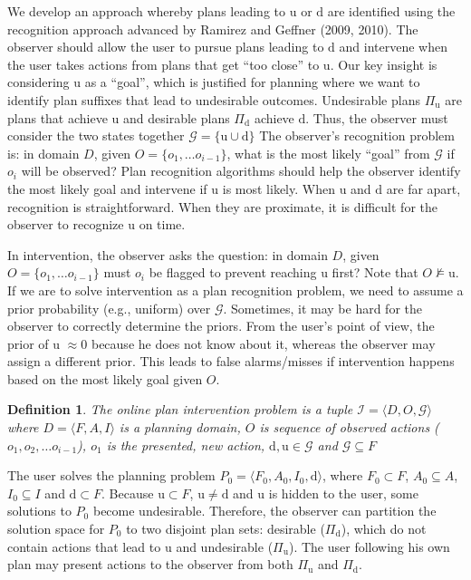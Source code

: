 \documentclass[letterpaper]{article}
\theoremstyle{plain}
\newtheorem{definition}{Definition}
\begin{document}
We develop an approach whereby plans leading to $\mathrm{u}$ or $\mathrm{d}$ are identified using the recognition approach advanced by Ramirez and Geffner (2009, 2010).
The observer should allow the user to pursue plans leading to $\mathrm{d}$ and intervene when the user takes actions from plans that get ``too close'' to $\mathrm{u}$.
Our key insight is considering $\mathrm{u}$ as a ``goal'', which is justified for planning where we want to identify plan suffixes that lead to undesirable outcomes. 
Undesirable plans $\Pi_{\mathrm{u}}$ are plans that achieve $\mathrm{u}$ and desirable plans $\Pi_{\mathrm{d}}$ achieve $\mathrm{d}$. 
Thus, the observer must consider the two states together $\mathcal{G}=\lbrace\mathrm{u} \cup \mathrm{d}\rbrace$
The observer's recognition problem is: in domain $D$, given $O = \lbrace o_1, \ldots o_{i-1}\rbrace$, what is the most likely ``goal'' from $\mathcal{G}$ if $o_i$ will be observed? 
Plan recognition algorithms should help the observer identify the most likely goal and intervene if $\mathrm{u}$ is most likely.
When $\mathrm{u}$ and $\mathrm{d}$ are far apart, recognition is straightforward.
When they are proximate, it is difficult for the observer to recognize $\mathrm{u}$ on time.

In intervention, the observer asks the question: in domain $D$, given $O = \lbrace o_1, \ldots o_{i-1}\rbrace$ must $o_i$ be flagged to prevent reaching $\mathrm{u}$ first?
Note that $O\not\models\mathrm{u}$. 
If we are to solve intervention as a plan recognition problem, we need to assume a prior probability (e.g., uniform) over $\mathcal{G}$. Sometimes, it may be hard for the observer to correctly determine the priors. From the user's point of view, the prior of $\mathrm{u}$ $\approx 0$ because he does not know about it, whereas the observer may assign a different prior. This leads to false alarms/misses if intervention happens based on the most likely goal given $O$.


\theoremstyle{definition}
\begin{definition}
The \textnormal{online plan intervention problem} is a tuple $\mathcal{I} = \langle D, O, \mathcal{G} \rangle$ where $D=\langle F, A, I \rangle$ is a planning domain, 
$O$ is  sequence of observed actions ($o_1, o_2, \ldots o_{i-1}$), $o_1$ is the presented, new action, $\mathrm{d},\mathrm{u} \in \mathcal{G}$ and $\mathcal{G} \subseteq F$
\end{definition}
The user solves the planning problem $P_0=\langle F_0, A_0, I_0,\mathrm{d}\rangle$, where $F_0 \subset F$, $A_0\subseteq A$, $I_0 \subseteq I$ and $\mathrm{d}\subset F$. 
Because $\mathrm{u}\subset F$, $\mathrm{u}\neq \mathrm{d}$ and $\mathrm{u}$ is hidden to the user, some solutions to $P_0$ become undesirable. Therefore, the observer can partition the solution space for $P_0$ to two disjoint plan sets: desirable ($\Pi_{\mathrm{d}}$), which do not contain actions that lead to $\mathrm{u}$ and undesirable ($\Pi_{\mathrm{u}}$). The user following his own plan may present actions to the observer from both $\Pi_{\mathrm{u}}$ and $\Pi_{\mathrm{d}}$. 
\end{document}
